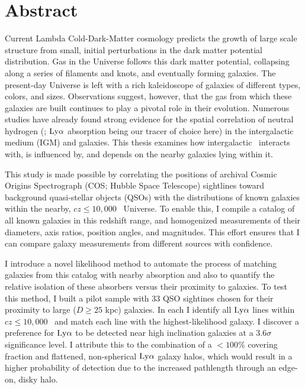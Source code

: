 \chapter*{Abstract}

Current Lambda Cold-Dark-Matter cosmology predicts the growth of large scale structure from small, initial perturbations in the dark matter potential distribution. Gas in the Universe follows this dark matter potential, collapsing along a series of filaments and knots, and eventually forming galaxies. The present-day Universe is left with a rich kaleidoscope of galaxies of different types, colors, and sizes. Observations suggest, however, that the gas from which these galaxies are built continues to play a pivotal role in their evolution. Numerous studies have already found strong evidence for the spatial correlation of neutral hydrogen (\HI; $\rm Ly\alpha$ absorption being our tracer of choice here) in the intergalactic medium (IGM) and galaxies. This thesis examines how intergalactic \HI~interacts with, is influenced by, and depends on the nearby galaxies lying within it. 

This study is made possible by correlating the positions of archival Cosmic Origins Spectrograph (COS; Hubble Space Telescope) sightlines toward background quasi-stellar objects (QSOs) with the distributions of known galaxies within the nearby, $cz \leq 10,000$ \kms~Universe. To enable this, I compile a catalog of all known galaxies in this redshift range, and homogenized measurements of their diameters, axis ratios, position angles, and magnitudes. This effort ensures that I can compare galaxy measurements from different sources with confidence. 

I introduce a novel likelihood method to automate the process of matching galaxies from this catalog with nearby absorption and also to quantify the relative isolation of these absorbers versus their proximity to galaxies. To test this method, I built a pilot sample with 33 QSO sightines chosen for their proximity to large ($D \ge 25$ kpc) galaxies. In each I identify all $\rm Ly\alpha$ lines within $cz \leq 10,000$ \kms~and match each line with the highest-likelihood galaxy. I discover a preference for $\rm Ly\alpha$ to be detected near high inclination galaxies at a $3.6\sigma$ significance level. I attribute this to the combination of a $< 100\%$ covering fraction and flattened, non-spherical $\rm Ly\alpha$ galaxy halos, which would result in a higher probability of detection due to the increased pathlength through an edge-on, disky halo.

